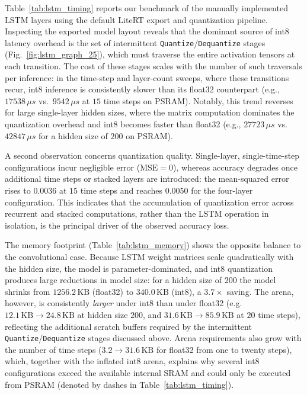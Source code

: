 \documentclass[12pt,DIV16,BCOR12mm,a4paper,footinclude=false,headinclude,parskip=half-,twoside,openright,cleardoublepage=empty,toc=index,bibliography=totoc,listof=totoc]{scrreprt}
\numberwithin{equation}{chapter}
\begin{document}
  Table~\ref{tab:lstm_timing} reports our benchmark of the manually implemented LSTM
  layers using the default LiteRT export and quantization pipeline. Inspecting the
  exported model layout reveals that the dominant source of int8 latency overhead is
  the set of intermittent \texttt{Quantize}/\texttt{Dequantize} stages
  (Fig.~\ref{fig:lstm_graph_25}), which must traverse the entire activation tensors at
  each transition. The cost of these stages scales with the number of such traversals
  per inference: in the time-step and layer-count sweeps, where these transitions
  recur, int8 inference is consistently slower than its float32 counterpart (e.g.,
  $17538\,\mu s$ vs.\ $9542\,\mu s$ at $15$ time steps on PSRAM). Notably, this trend
  reverses for large single-layer hidden sizes, where the matrix computation dominates
  the quantization overhead and int8 becomes faster than float32 (e.g.,
  $27723\,\mu s$ vs.\ $42847\,\mu s$ for a hidden size of $200$ on PSRAM).

  A second observation concerns quantization quality. Single-layer, single-time-step
  configurations incur negligible error ($\mathrm{MSE}=0$), whereas accuracy degrades
  once additional time steps or stacked layers are introduced: the mean-squared error
  rises to $0.0036$ at $15$ time steps and reaches $0.0050$ for the four-layer
  configuration. This indicates that the accumulation of quantization error across
  recurrent and stacked computations, rather than the LSTM operation in isolation, is
  the principal driver of the observed accuracy loss.

  The memory footprint (Table~\ref{tab:lstm_memory}) shows the opposite balance to the
  convolutional case. Because LSTM weight matrices scale quadratically with the hidden
  size, the model is parameter-dominated, and int8 quantization produces large reductions
  in model size: for a hidden size of $200$ the model shrinks from
  $1256.2\,\mathrm{KB}$ (float32) to $340.0\,\mathrm{KB}$ (int8), a $3.7\times$
  saving. The arena, however, is consistently \emph{larger} under int8 than under
  float32 (e.g.\ $12.1\,\mathrm{KB}\to24.8\,\mathrm{KB}$ at hidden size $200$, and
  $31.6\,\mathrm{KB}\to85.9\,\mathrm{KB}$ at $20$ time steps), reflecting the additional
  scratch buffers required by the intermittent \texttt{Quantize}/\texttt{Dequantize}
  stages discussed above. Arena requirements also grow with the number of time steps
  ($3.2\to31.6\,\mathrm{KB}$ for float32 from one to twenty steps), which, together with
  the inflated int8 arena, explains why several int8 configurations exceed the available
  internal SRAM and could only be executed from PSRAM (denoted by dashes in
  Table~\ref{tab:lstm_timing}).
\end{document}
